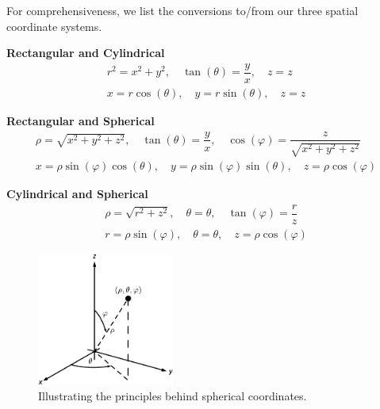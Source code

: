 For comprehensiveness, we list the conversions to/from our three spatial coordinate systems.

\textbf{Rectangular and Cylindrical}
\begin{equation}\begin{array}{c}
r^2 = x^2+y^2,\quad \tan (\theta) = \dfrac{y}{x},\quad z=z\\[0.2cm]
x=r\cos (\theta), \quad y=r\sin(\theta),\quad z=z
\end{array}
\end{equation}

\textbf{Rectangular and Spherical}
\begin{equation}
\begin{array}{c}
\rho = \sqrt{x^2+y^2+z^2},\quad \tan (\theta) = \dfrac{y}{x},\quad \cos (\varphi) = \dfrac{z}{\sqrt{x^2+y^2+z^2}}\\[0.2cm]
x=\rho\sin(\varphi)\cos(\theta),\quad y=\rho\sin(\varphi)\sin(\theta),\quad z=\rho\cos(\varphi)
\end{array}
\end{equation}

\textbf{Cylindrical and Spherical }
\begin{equation}
\begin{array}{c}
\rho=\sqrt{r^2+z^2}, \quad \theta = \theta,\quad \tan (\varphi) = \dfrac{r}{z} \\[0.2cm]
r=\rho \sin (\varphi), \quad \theta = \theta, \quad z=\rho\cos(\varphi)
\end{array}
\end{equation}

\begin{figure}[h]
	\begin{center}
			\includegraphics[width=0.4\textwidth]{fig_multiple_31}
	\caption{Illustrating the principles behind spherical coordinates.}
	\label{fig_multiple_31}
	\end{center}
\end{figure}


